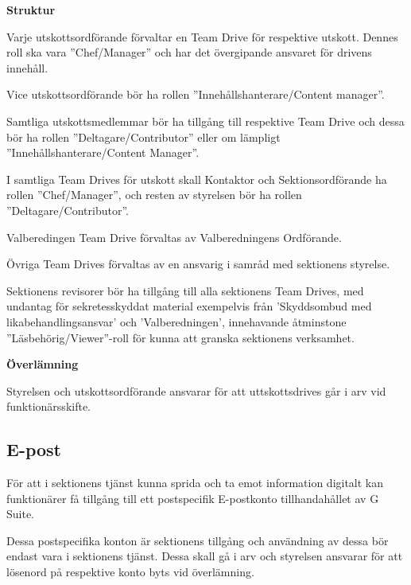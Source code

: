\documentclass[10pt]{article}
\begin{document}
    \textbf{Struktur}
    \begin{dashlist}

    \item Varje utskottsordförande förvaltar en Team Drive för respektive utskott. Dennes roll ska vara ''Chef/Manager'' och har det övergipande ansvaret för drivens innehåll. 
    
    \item Vice utskottsordförande bör ha rollen ''Innehållshanterare/Content manager''. 

    \item Samtliga utskottsmedlemmar bör ha tillgång till respektive Team Drive och dessa bör ha rollen ''Deltagare/Contributor'' eller om lämpligt ''Innehållshanterare/Content Manager''. 
    
    \item I samtliga Team Drives för utskott skall Kontaktor och Sektionsordförande ha rollen ''Chef/Manager'', och resten av styrelsen bör ha rollen ''Deltagare/Contributor''.
    
    \item Valberedingen Team Drive förvaltas av Valberedningens Ordförande.
    
    \item Övriga Team Drives förvaltas av en ansvarig i samråd med sektionens styrelse. 

    \item Sektionens revisorer bör ha tillgång till alla sektionens Team Drives, med undantag för sekretesskyddat material exempelvis från 'Skyddsombud med likabehandlingsansvar' och 'Valberedningen', innehavande åtminstone ''Läsbehörig/Viewer''-roll för kunna att granska sektionens verksamhet. 
     
    \end{dashlist}

    \textbf{Överlämning}

    Styrelsen och utskottsordförande ansvarar för att uttskottsdrives går i arv vid funktionärsskifte.

    \vspace{10px}
    \subsection{E-post}
    För att i sektionens tjänst kunna sprida och ta emot information digitalt kan funktionärer få tillgång till ett postspecifik E-postkonto tillhandahållet av G Suite.  

    Dessa postspecifika konton är sektionens tillgång och användning av dessa bör endast vara i sektionens tjänst. 
    Dessa skall gå i arv och styrelsen ansvarar för att lösenord på respektive konto byts vid överlämning. 
    
\end{document}
